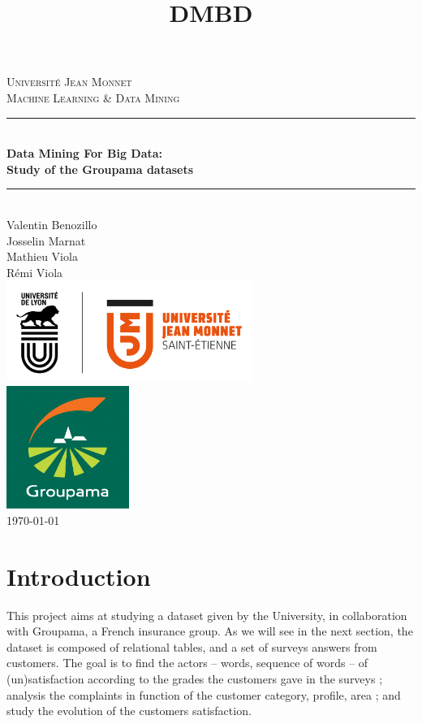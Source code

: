 \documentclass[a4paper, 11pt]{article}
\title{DMBD}
\newcommand{\HRule}{\rule{\linewidth}{0.5mm}}
\begin{document}
\thispagestyle{empty}
	\vspace{2cm}
	\begin{center}
		\LARGE{\textsc{Université Jean Monnet}}\\[1cm]
		\Large{\textsc{Machine Learning \& Data Mining}} \\[0.5cm]
		\HRule \\[0.5cm]
		{ \huge \bfseries Data Mining For Big Data:\\[.5em]Study of the Groupama datasets}\\[0.4cm]
		\HRule \\[1cm]
        Valentin Benozillo \\
        Josselin Marnat \\
        Mathieu Viola \\
        Rémi Viola \\
		\normalsize
		\vfill
        \includegraphics[width=8cm]{Img/UJM.png} \\[1cm]
        \includegraphics[width=4cm]{Img/groupama.jpg} \\[1cm]
		\vfill
        \today
	\end{center}
	\newpage

\newpage



\tableofcontents

\newpage
\section{Introduction} %
\label{sec:intro}
	This project aims at studying a dataset given by the University, in collaboration with Groupama, a French insurance group. As we will see in the next section, the dataset is composed of relational tables, and a set of surveys answers from customers. The goal is to find the actors -- words, sequence of words -- of (un)satisfaction according to the grades the customers gave in the surveys ; analysis the complaints in function of the customer category, profile, area ; and study the evolution of the customers satisfaction. \\
\end{document}
